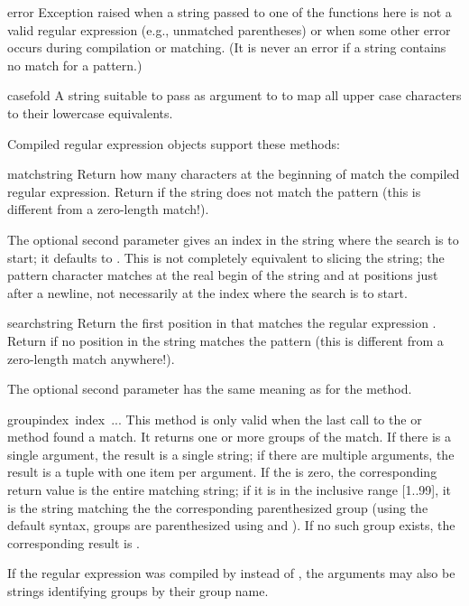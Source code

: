 \begin{excdesc}{error}
  Exception raised when a string passed to one of the functions here
  is not a valid regular expression (e.g., unmatched parentheses) or
  when some other error occurs during compilation or matching.  (It is
  never an error if a string contains no match for a pattern.)
\end{excdesc}

\begin{datadesc}{casefold}
A string suitable to pass as  argument to
 to map all upper case characters to their lowercase
equivalents.
\end{datadesc}

\noindent
Compiled regular expression objects support these methods:

\renewcommand{\indexsubitem}{(regex method)}
\begin{funcdesc}{match}{string}
  Return how many characters at the beginning of  match
  the compiled regular expression.  Return  if the string
  does not match the pattern (this is different from a zero-length
  match!).
  
  The optional second parameter  gives an index in the string
  where the search is to start; it defaults to .  This is not
  completely equivalent to slicing the string; the  pattern
  character matches at the real begin of the string and at positions
  just after a newline, not necessarily at the index where the search
  is to start.
\end{funcdesc}

\begin{funcdesc}{search}{string}
  Return the first position in  that matches the regular
  expression .  Return  if no position in the
  string matches the pattern (this is different from a zero-length
  match anywhere!).
  
  The optional second parameter has the same meaning as for the
   method.
\end{funcdesc}

\begin{funcdesc}{group}{index\, index\, ...}
This method is only valid when the last call to the 
or  method found a match.  It returns one or more
groups of the match.  If there is a single  argument,
the result is a single string; if there are multiple arguments, the
result is a tuple with one item per argument.  If the  is
zero, the corresponding return value is the entire matching string; if
it is in the inclusive range [1..99], it is the string matching the
the corresponding parenthesized group (using the default syntax,
groups are parenthesized using \code{\\(} and \code{\\)}).  If no
such group exists, the corresponding result is .

If the regular expression was compiled by  instead of
, the  arguments may also be strings
identifying groups by their group name.
\end{funcdesc}

